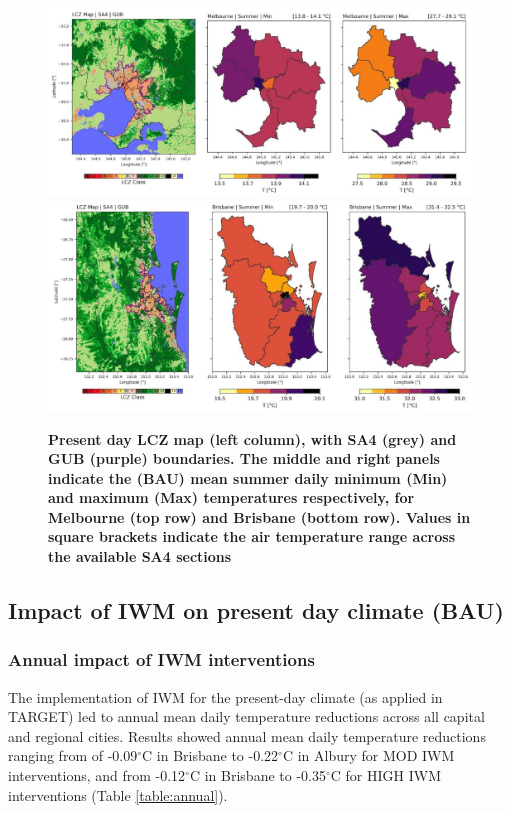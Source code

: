 \documentclass[final,3p,times,authoryear]{elsarticle}
\begin{document}
\begin{figure}
\centering
\includegraphics[trim={0 0 0 0},clip,scale=0.25]{images/image9.jpg}
\includegraphics[trim={0 0 0 0},clip,scale=0.25]{images/image8.jpg}
\caption{\bf Present day LCZ map (left column), with SA4 (grey) and GUB (purple) boundaries. The middle and right panels indicate the (BAU) mean summer daily minimum (Min) and maximum (Max) temperatures respectively, for Melbourne (top row) and Brisbane (bottom row). Values in square brackets indicate the air temperature range across the available SA4 sections}
 \label{fig:lczsa4}
\end{figure}

\subsection{Impact of IWM on present day climate (BAU)}\label{sec:results2}

\subsubsection{Annual impact of IWM interventions}\label{sec:results2a}

The implementation of IWM for the present-day climate (as applied in TARGET) led to annual mean daily temperature reductions across all capital and regional cities. Results showed annual mean daily temperature reductions ranging from of -0.09$^{\circ}$C in Brisbane to -0.22$^{\circ}$C in Albury for MOD IWM interventions, and from -0.12$^{\circ}$C in Brisbane to -0.35$^{\circ}$C for HIGH IWM interventions (Table \ref{table:annual}). 
\end{document}
